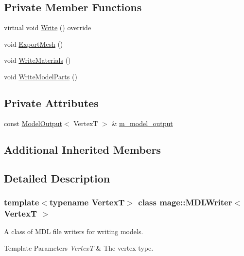 \subsection*{Private Member Functions}
\begin{DoxyCompactItemize}
\item 
virtual void \hyperlink{classmage_1_1_m_d_l_writer_aa326a70b449baae2d7db8043e2731327}{Write} () override
\item 
void \hyperlink{classmage_1_1_m_d_l_writer_af3f41c26153fe3d22b6a4d62140ca113}{Export\+Mesh} ()
\item 
void \hyperlink{classmage_1_1_m_d_l_writer_af9416c1b2599ea86f4af8018dc0b9baf}{Write\+Materials} ()
\item 
void \hyperlink{classmage_1_1_m_d_l_writer_a3db84a4600cb777b37c666166a631689}{Write\+Model\+Parts} ()
\end{DoxyCompactItemize}
\subsection*{Private Attributes}
\begin{DoxyCompactItemize}
\item 
const \hyperlink{structmage_1_1_model_output}{Model\+Output}$<$ VertexT $>$ \& \hyperlink{classmage_1_1_m_d_l_writer_a607fc83a3dbab79f55c3eaca203c027b}{m\+\_\+model\+\_\+output}
\end{DoxyCompactItemize}
\subsection*{Additional Inherited Members}


\subsection{Detailed Description}
\subsubsection*{template$<$typename VertexT$>$\newline
class mage\+::\+M\+D\+L\+Writer$<$ Vertex\+T $>$}

A class of M\+DL file writers for writing models.


\begin{DoxyTemplParams}{Template Parameters}
{\em VertexT} & The vertex type. \\
\hline
\end{DoxyTemplParams}


